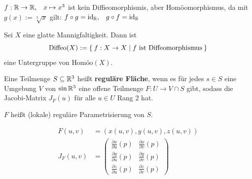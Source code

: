 \begin{beispiel}
    $f: \mathbb{R} \rightarrow \mathbb{R}, \;\;\; x \mapsto x^3$ ist kein
    Diffieomorphismis, aber Homöomorphismus, da mit $g(x) := \sqrt[3]{x}$
    gilt: $f \circ g = \text{id}_{\mathbb{R}}, \;\;\; g \circ f = \text{id}_\text{\ensuremath{\mathbb{R}}}$
\end{beispiel}

\begin{bemerkung}
    Sei $X$ eine glatte Mannigfaltigkeit. Dann ist
    \[\text{Diffeo}(X) := \Set{f:X \rightarrow X | f \text{ ist Diffeomorphismus}}\]
    eine Untergruppe von $\text{Homöo}(X)$.
\end{bemerkung}

\begin{definition}
    Eine Teilmenge $S \subseteq \mathbb{R}^3$ heißt \textbf{reguläre Fläche},
    wenn es für jedes $s \in S$ eine Umgebung $V$ von $\sin{\ensuremath{\mathbb{R}}^3}$
    eine offene Teilmenge $F: U \rightarrow V \cap S$ gibt, sodass
    die Jacobi-Matrix $J_F(u)$ für alle $u \in U$ Rang 2 hat.

    $F$ heißt (lokale) reguläre Parametrisierung von $S$.

    \begin{align*}
        F(u,v) &= \left (x(u,v), y(u,v), z(u,v) \right )\\
        J_F(u,v) &= \begin{pmatrix}
            \frac{\partial x}{\partial u} (p) & \frac{\partial x}{\partial v} (p)\\
            \frac{\partial y}{\partial u} (p) & \frac{\partial y}{\partial v} (p)\\
            \frac{\partial z}{\partial u} (p) & \frac{\partial z}{\partial v} (p)
        \end{pmatrix}
    \end{align*}
\end{definition}

